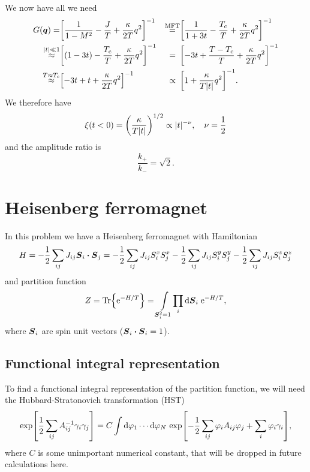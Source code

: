\documentclass[11pt,letter, swedish, english
]{article}
\newcommand{\Tc}{\ensuremath{T_{\text{c}}}}
\begin{document}
We now have all we need
\begin{equation}
\begin{aligned}
G(\vb*q)=&\qty[\frac{1}{1-M^2}-\frac{J}{T}+\frac{\kappa}{2T}q^2]^{-1}
&\stackrel{\text{MFT}}{=}&
\qty[\frac{1}{1+3t}-\frac{\Tc}{T}+\frac{\kappa}{2T}q^2]^{-1}\\
\stackrel{|t|\ll1}{\approx}&
\qty[(1-3t)-\frac{\Tc}{T}+\frac{\kappa}{2T}q^2]^{-1}
&=\hspace{5pt}&
\qty[-3t+\frac{T-\Tc}{T}+\frac{\kappa}{2T}q^2]^{-1}\\
\stackrel{T\approx\Tc}{\approx}&
\qty[-3t+t+\frac{\kappa}{2T}q^2]^{-1}
&\propto\hspace{5pt}&
\qty[1+\frac{\kappa}{T|t|}q^2]^{-1}.
\end{aligned}
\end{equation}
We therefore have
\begin{equation}
\xi(t<0)=\qty(\frac{\kappa}{T|t|})^{1/2}
\propto |t|^{-\nu}\qcomma \nu=\frac{1}{2}
\end{equation}
and the amplitude ratio is
\begin{equation}
\frac{k_+}{k_-}=\sqrt{2}.
\end{equation}





\section{Heisenberg ferromagnet}
In this problem we have a Heisenberg ferromagnet with Hamiltonian
\begin{equation}
H=-\frac{1}{2}\sum_{ij}J_{ij}\vb*S_i\vdot\vb*S_j
=-\frac{1}{2}\sum_{ij}J_{ij}S_i^xS_j^x
-\frac{1}{2}\sum_{ij}J_{ij}S_i^yS_j^y
-\frac{1}{2}\sum_{ij}J_{ij}S_i^zS_j^z
\end{equation}
and partition function
\begin{equation}\label{eq:3_Z1}
Z=\Tr{\ee^{-H/T}}=\int_{\vb*S_i^2=1}\!\prod_i\rd{\vb*S_i}\;\ee^{-H/T},
\end{equation}
where $\vb*S_i$ are spin unit vectors ($\vb*S_i\vdot\vb*S_i=1$).

\subsection{Functional integral representation}
To find a functional integral representation of the partition
function, we will need the Hubbard-Stratonovich transformation (HST)
\begin{equation}
\exp[\frac{1}{2}\sum_{ij}A_{ij}^{-1}\gamma_i\gamma_j]
=C\int\rd\varphi_1\cdots\rd\varphi_N 
\,\exp[-\frac{1}{2}\sum_{ij}\varphi_iA_{ij}\varphi_j+\sum_i\varphi_i\gamma_i],
\end{equation}
where $C$ is some unimportant numerical constant, that will be dropped
in future calculations here. 
\end{document}
